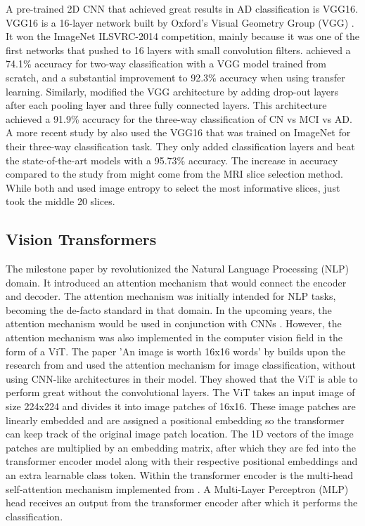 \documentclass[11pt, a4paper]{article}
\begin{document}
 A pre-trained 2D CNN that achieved great results in AD classification is VGG16. VGG16 is a 16-layer network built by Oxford's Visual Geometry Group (VGG) \citep{Simonyan2014VeryRecognition}. It won the ImageNet ILSVRC-2014 competition, mainly because it was one of the first networks that pushed to 16 layers with small convolution filters. \cite{Hon2017TowardsLearning} achieved a 74.1\% accuracy for two-way classification with a VGG model trained from scratch, and a substantial improvement to 92.3\% accuracy when using transfer learning. Similarly, \cite{Billones2017DemNet:Impairment} modified the VGG architecture by adding drop-out layers after each pooling layer and three fully connected layers. This architecture achieved a 91.9\% accuracy for the three-way classification of CN vs MCI vs AD. A more recent study by \cite{Jain2019ConvolutionalImages} also used the VGG16 that was trained on ImageNet for their three-way classification task. They only added classification layers and beat the state-of-the-art models with a 95.73\% accuracy. The increase in accuracy compared to the study from \cite{Billones2017DemNet:Impairment} might come from the MRI slice selection method. While both \cite{Jain2019ConvolutionalImages} and \cite{Hon2017TowardsLearning} used image entropy to select the most informative slices, \cite{Billones2017DemNet:Impairment} just took the middle 20 slices.

 \subsection{Vision Transformers} \label{subs:ViT}
The milestone paper by \cite{Vaswani2017AttentionNeed} revolutionized the Natural Language Processing (NLP) domain. It introduced an attention mechanism that would connect the encoder and decoder. The attention mechanism was initially intended for NLP tasks, becoming the de-facto standard in that domain. In the upcoming years, the attention mechanism would be used in conjunction with CNNs \citep{Wang2018Non-localNetworks,Carion2020End-to-EndTransformers}. However, the attention mechanism was also implemented in the computer vision field in the form of a ViT. The paper 'An image is worth 16x16 words' by \cite{Dosovitskiy2020AnScale} builds upon the research from \cite{Vaswani2017AttentionNeed} and used the attention mechanism for image classification, without using CNN-like architectures in their model. They showed that the ViT is able to perform great without the convolutional layers. The ViT takes an input image of size 224x224 and divides it into image patches of 16x16. These image patches are linearly embedded and are assigned a positional embedding so the transformer can keep track of the original image patch location. The 1D vectors of the image patches are multiplied by an embedding matrix, after which they are fed into the transformer encoder model along with their respective positional embeddings and an extra learnable class token. Within the transformer encoder is the multi-head self-attention mechanism implemented from \cite{Vaswani2017AttentionNeed}. A Multi-Layer Perceptron (MLP) head receives an output from the transformer encoder after which it performs the classification. 
\end{document}
